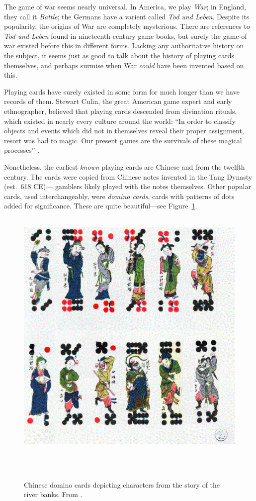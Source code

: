 \documentclass[12pt]{amsart}
\begin{document}
The game of war seems nearly universal. In America, we play \emph{War}; in
England, they call it \emph{Battle}; the Germans have a varient called
\emph{Tod und Leben}. Despite its popularity, the origins of War are completely
mysterious. There are references to \emph{Tod und Leben} found in nineteenth
century game books, but surely the game of war existed before this in different
forms. Lacking any authoritative history on the subject, it seems just as good
to talk about the history of playing cards themselves, and perhaps surmise when
War \emph{could} have been invented based on this.

Playing cards have surely existed in some form for much longer than we have
records of them. Stewart Culin, the great American game expert and early
ethnographer, believed that playing cards descended from divination rituals,
which existed in nearly every culture around the world: ``In order to classify
objects and events which did not in themselves reveal their proper assignment,
resort was had to magic. Our present games are the survivals of these magical
processes'' \cite[p.~1]{hargrave}.

Nonetheless, the earliest \emph{known} playing cards are Chinese and from the
twelfth century. The cards were copied from Chinese notes invented in the Tang
Dynasty (est.~618 CE)--- gamblers likely played with the notes themselves.
Other popular cards, used interchangeably, were \emph{domino cards}, cards with
patterns of dots added for significance. These are quite beautiful---see
Figure~\ref{fig:domino}.

\begin{figure}[htpb]
    \centering
    \includegraphics[width=0.8\linewidth]{domino}
    \caption{Chinese domino cards depicting characters from the story of the
    river banks. From \cite{hargrave}.}
    \label{fig:domino}
\end{figure}
\end{document}
